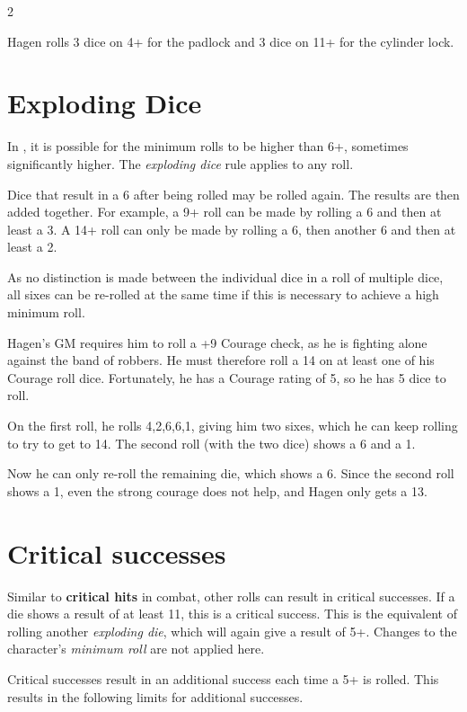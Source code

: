 \begin{multicols}{2}
\begin{pexample}[Example]
Hagen rolls 3 dice on 4+ for the padlock and 3 dice on 11+ for the cylinder lock.
\end{pexample}

\section{Exploding Dice}

In , it is possible for the minimum rolls to be higher than 6+, sometimes significantly higher. The \textit{exploding dice} rule applies to any roll.

Dice that result in a 6 after being rolled may be rolled again. The results are then added together. For example, a 9+ roll can be made by rolling a 6 and then at least a 3. A 14+ roll can only be made by rolling a 6, then another 6 and then at least a 2.

As no distinction is made between the individual dice in a roll of multiple dice, all sixes can be re-rolled at the same time if this is necessary to achieve a high minimum roll.

\begin{pexample}[Example]
Hagen's GM requires him to roll a +9 Courage check, as he is fighting alone against the band of robbers. He must therefore roll a 14 on at least one of his Courage roll dice. Fortunately, he has a Courage rating of 5, so he has 5 dice to roll.

On the first roll, he rolls 4,2,6,6,1, giving him two sixes, which he can keep rolling to try to get to 14. The second roll (with the two dice) shows a 6 and a 1.

Now he can only re-roll the remaining die, which shows a 6. Since the second roll shows a 1, even the strong courage does not help, and Hagen only gets a 13.
\end{pexample}

\section{Critical successes}

Similar to \textbf{critical hits} in combat, other rolls can result in critical successes. If a die shows a result of at least 11, this is a critical success. This is the equivalent of rolling another \textit{exploding die}, which will again give a result of 5+. Changes to the character's \textit{minimum roll} are not applied here.

Critical successes result in an additional success each time a 5+ is rolled. This results in the following limits for additional successes.


\end{multicols}
